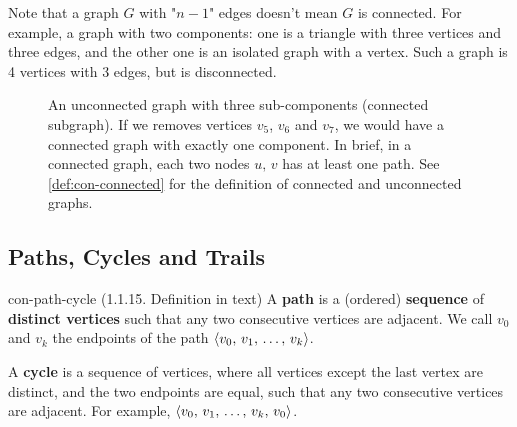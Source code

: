 \documentclass[../src/handouts/main.tex]{subfiles}
\begin{document}
Note that a graph $G$ with "$n - 1$" edges doesn't mean $G$ is connected. For example, a graph with two components: one is a triangle with three vertices and three edges, and the other one is an isolated graph with a vertex. Such a graph is 4 vertices with 3 edges, but is disconnected.


\begin{figure}[htbp]
  \centering
  \caption{An unconnected graph with three sub-components (connected subgraph). If we removes vertices $v_5$, $v_6$ and $v_7$, we would have a connected graph with exactly one component. In brief, in a connected graph, each two nodes $u,\, v$ has at least one path. See \cref{def:con-connected} for the definition of connected and unconnected graphs.}
  \label{fig:con-connected-graph-interlude}
\end{figure}

\subsection{Paths, Cycles and Trails}\label{subsec:con-path}

\begin{definition}{}{con-path-cycle}
  (1.1.15. Definition in text)
  A \textbf{path} is a (ordered) \textbf{sequence} of \textbf{distinct vertices} such that any two consecutive vertices are adjacent. We call $v_0$ and $v_k$ the endpoints of the path $\langle v_0,\, v_1,\, \ldots,\, v_k\rangle$.

  A \textbf{cycle} is a sequence of vertices, where all vertices except the last vertex are distinct, and the two endpoints are equal, such that any two consecutive vertices are adjacent. For example, $\langle v_0,\, v_1,\, \ldots,\, v_k,\, v_0\rangle$.
\end{definition}
\end{document}
